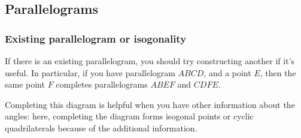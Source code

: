 \documentclass[11pt,paper=letter]{scrartcl}
\begin{document}
\subsection{Parallelograms}

\subsubsection*{Existing parallelogram or isogonality}

If there is an existing parallelogram, you should try constructing another if it's useful. In particular, if you have parallelogram $ABCD$, and a point $E$, then the same point $F$ completes parallelograms $ABEF$ and $CDFE$. 

Completing this diagram is helpful when you have other information about the angles: here, completing the diagram forms isogonal points or cyclic quadrilaterals because of the additional information. 
\end{document}
